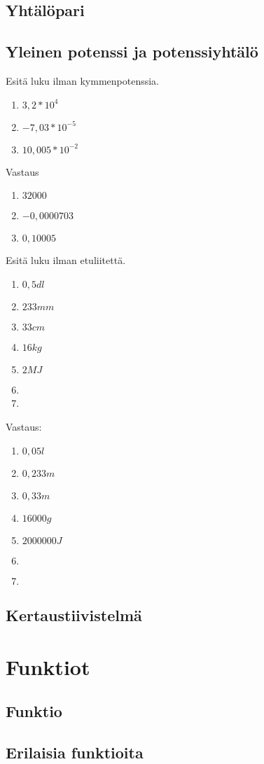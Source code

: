 \chapter{Yhtälöpari}


\chapter{Yleinen potenssi ja potenssiyhtälö}

\begin{tehtava}
Esitä luku ilman kymmenpotenssia.
\begin{enumerate}
\item $3,2 * 10^4$
\item $-7,03 * 10^{-5}$
\item $10,005 * 10^{-2}$
\end{enumerate}
\begin{vastaus}
Vastaus
\begin{enumerate}
\item $32000$
\item $-0,0000703$
\item $0,10005$
\end{enumerate}
\end{vastaus}
\end{tehtava}

\begin{tehtava}
Esitä luku ilman etuliitettä.
\begin{enumerate}
\item $0,5 dl$
\item $233 mm$
\item $33 cm$
\item $16 kg$
\item $2 MJ$
\item %
\item 
\end{enumerate}
\begin{vastaus}
Vastaus:
\begin{enumerate}
\item $0,05 l$
\item $0,233 m$
\item $0,33 m$
\item $16 000 g$
\item $2 000 000 J$
\item $ $
\item $ $
\end{enumerate}
\end{vastaus}
\end{tehtava}


\chapter{Kertaustiivistelmä}

\part{Funktiot}
\chapter{Funktio}
\chapter{Erilaisia funktioita}